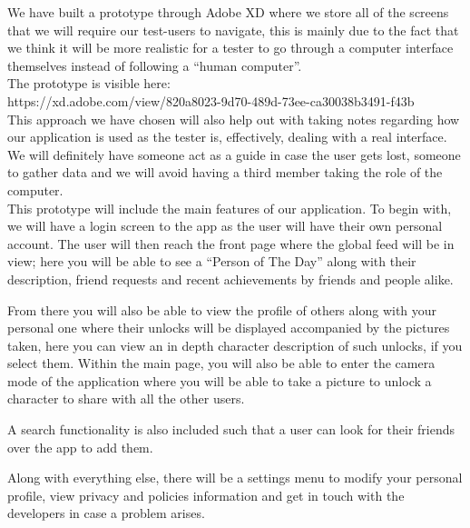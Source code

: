 \documentclass[12pt]{scrartcl}
\begin{document}
		
		We have built a prototype through Adobe XD where we store all of the screens that we will
		require our test-users to navigate, this is mainly due to the fact that we think it will be more
		realistic for a tester to go through a computer interface themselves instead of following a 
		``human computer''.\\
		
		The prototype is visible here:\\
		https://xd.adobe.com/view/820a8023-9d70-489d-73ee-ca30038b3491-f43b\\
		
		This approach we have chosen will also help out with taking notes regarding how our 
		application is used as the tester is, effectively, dealing with a real interface. We will definitely 
		have someone act as a guide in case the user gets lost, someone to gather data and we will 
		avoid having a third member taking the role of the computer.\\
	
		This prototype will include the main features of our application. To begin with, we will have a 
		login screen to the app as the user will have their own personal account. The user will then 
		reach the front page where the global feed will be in view; here you will be able to see a 
		``Person of The  Day'' along with their description, friend requests and recent achievements by 
		friends and  people alike. 
	
		From there you will also be able to view the profile of others along with your personal one where
		their unlocks will be displayed accompanied by the pictures taken, here you can view an in 
		depth 
		character description of such unlocks, if you select them. Within the main page, you will also 
		be able to enter the camera mode of the application where you will be able to take a picture to 
		unlock a character to share with all the other users.
	
		A search functionality is also included such that a user can look for their friends over the app
		to add them.
	
		Along with everything else, there will be a settings menu to modify your personal profile, view
		privacy and policies information and get in touch with the developers in case a problem arises.
		
		
		\newpage
	
\end{document}
